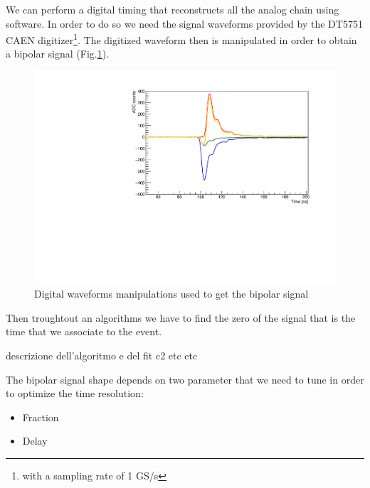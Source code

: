 \documentclass[a4paper,11pt]{article}
\begin{document}
We can perform a digital timing that reconstructs all the analog chain using software. In order to do so we need the signal waveforms provided by the DT5751 CAEN digitizer\footnote{with a sampling rate of 1 GS/s}.
The digitized waveform then is manipulated in order to obtain a bipolar signal (Fig.\ref{Fig: digital waveform manipulations}).
\begin{figure}[h!]
\centering
\includegraphics[width=\textwidth]{digital_waveform}
\caption{Digital waveforms manipulations used to get the bipolar signal}
\label{Fig: digital waveform manipulations}
\end{figure}
Then troughtout an algorithms we have to find the zero of the signal that is the time that we associate to the event.

\medskip
descrizione dell'algoritmo e del fit c2 etc etc
\medskip

\noindent The bipolar signal shape depends on two parameter that we need to tune in order to optimize the time resolution:
\begin{itemize}
\item Fraction
\item Delay
\end{itemize}
\end{document}
